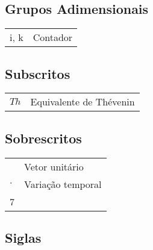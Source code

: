 \subsection*{Grupos Adimensionais}

\begin{tabular}{p{}p{}}
i, k    &   Contador    \tabularnewline
\end{tabular}


\subsection*{Subscritos}

\begin{tabular}{p{}p{}}
$Th$    & Equivalente de Thévenin   \tabularnewline
\end{tabular}


\subsection*{Sobrescritos}

\begin{tabular}{p{}p{}}
$\hat{}$    & Vetor unitário    \tabularnewline
$\cdot$     & Variação temporal \tabularnewline7
\end{tabular}


\subsection*{Siglas}

